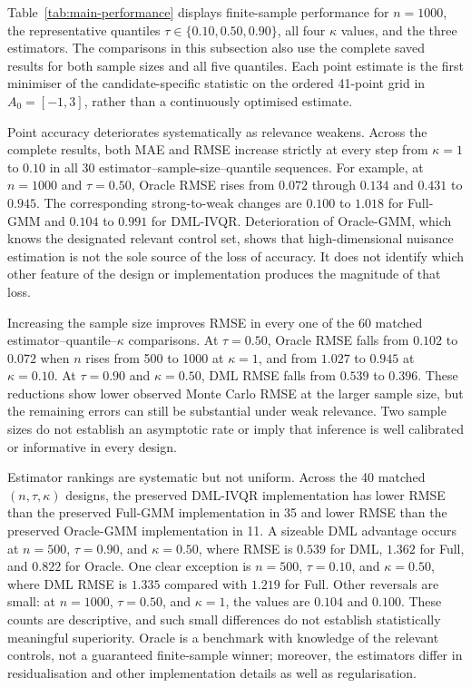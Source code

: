 Table~\ref{tab:main-performance} displays finite-sample performance for $n=1000$, the representative quantiles $\tau\in\{0.10,0.50,0.90\}$, all four $\kappa$ values, and the three estimators. The comparisons in this subsection also use the complete saved results for both sample sizes and all five quantiles. Each point estimate is the first minimiser of the candidate-specific statistic on the ordered 41-point grid in $A_0=[-1,3]$, rather than a continuously optimised estimate.



Point accuracy deteriorates systematically as relevance weakens. Across the complete results, both MAE and RMSE increase strictly at every step from $\kappa=1$ to $0.10$ in all 30 estimator--sample-size--quantile sequences. For example, at $n=1000$ and $\tau=0.50$, Oracle RMSE rises from $0.072$ through $0.134$ and $0.431$ to $0.945$. The corresponding strong-to-weak changes are $0.100$ to $1.018$ for Full-GMM and $0.104$ to $0.991$ for DML-IVQR. Deterioration of Oracle-GMM, which knows the designated relevant control set, shows that high-dimensional nuisance estimation is not the sole source of the loss of accuracy. It does not identify which other feature of the design or implementation produces the magnitude of that loss.

Increasing the sample size improves RMSE in every one of the 60 matched estimator--quantile--$\kappa$ comparisons. At $\tau=0.50$, Oracle RMSE falls from $0.102$ to $0.072$ when $n$ rises from 500 to 1000 at $\kappa=1$, and from $1.027$ to $0.945$ at $\kappa=0.10$. At $\tau=0.90$ and $\kappa=0.50$, DML RMSE falls from $0.539$ to $0.396$. These reductions show lower observed Monte Carlo RMSE at the larger sample size, but the remaining errors can still be substantial under weak relevance. Two sample sizes do not establish an asymptotic rate or imply that inference is well calibrated or informative in every design.

Estimator rankings are systematic but not uniform. Across the 40 matched $(n,\tau,\kappa)$ designs, the preserved DML-IVQR implementation has lower RMSE than the preserved Full-GMM implementation in 35 and lower RMSE than the preserved Oracle-GMM implementation in 11. A sizeable DML advantage occurs at $n=500$, $\tau=0.90$, and $\kappa=0.50$, where RMSE is $0.539$ for DML, $1.362$ for Full, and $0.822$ for Oracle. One clear exception is $n=500$, $\tau=0.10$, and $\kappa=0.50$, where DML RMSE is $1.335$ compared with $1.219$ for Full. Other reversals are small: at $n=1000$, $\tau=0.50$, and $\kappa=1$, the values are $0.104$ and $0.100$. These counts are descriptive, and such small differences do not establish statistically meaningful superiority. Oracle is a benchmark with knowledge of the relevant controls, not a guaranteed finite-sample winner; moreover, the estimators differ in residualisation and other implementation details as well as regularisation.

